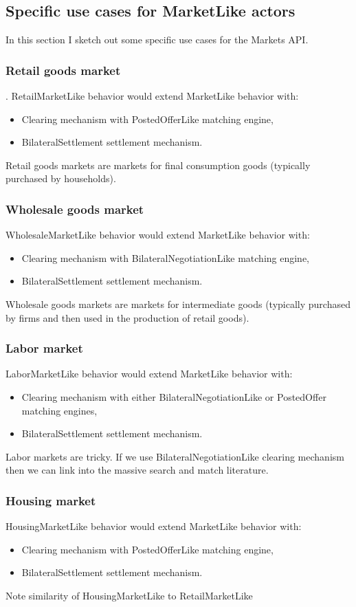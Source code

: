 \documentclass[a4paper]{article}
\begin{document}
\subsection{Specific use cases for MarketLike actors} In this section I sketch out some specific use cases for the Markets API.

\subsubsection{Retail goods market}. RetailMarketLike behavior would extend MarketLike behavior with:
\begin{itemize}
    \item Clearing mechanism with PostedOfferLike matching engine,
    \item BilateralSettlement settlement mechanism.
\end{itemize}
Retail goods markets are markets for final consumption goods (typically purchased by households).

\subsubsection{Wholesale goods market} WholesaleMarketLike behavior would extend MarketLike behavior with:
\begin{itemize}
    \item Clearing mechanism with BilateralNegotiationLike matching engine,
    \item BilateralSettlement settlement mechanism.
\end{itemize}
Wholesale goods markets are markets for intermediate goods (typically purchased by firms and then used in the production of retail goods).

\subsubsection{Labor market} LaborMarketLike behavior would extend MarketLike behavior with:
\begin{itemize}
    \item Clearing mechanism with either BilateralNegotiationLike or PostedOffer matching engines,
    \item BilateralSettlement settlement mechanism.
\end{itemize}
Labor markets are tricky. If we use BilateralNegotiationLike clearing mechanism then we can link into the massive search and match literature.

\subsubsection{Housing market} HousingMarketLike behavior would extend MarketLike behavior with:
\begin{itemize}
    \item Clearing mechanism with PostedOfferLike matching engine,
    \item BilateralSettlement settlement mechanism.
\end{itemize}
Note similarity of HousingMarketLike to RetailMarketLike
\end{document}
